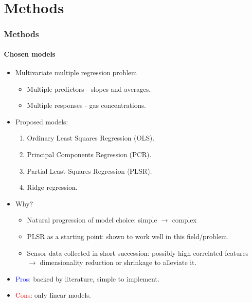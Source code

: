\documentclass{beamer}
\begin{document}
\section{Methods}
\begin{frame}
	\frametitle{Methods}
	\framesubtitle{Chosen models}
	
	\begin{itemize}
		\item Multivariate multiple regression problem
		\begin{itemize}
			\item Multiple predictors - slopes and averages.
			\item Multiple responses - gas concentrations.
		\end{itemize}
		\item Proposed models:
		\begin{enumerate}
			\item Ordinary Least Squares Regression (OLS).
			\item Principal Components Regression (PCR).
			\item Partial Least Squares Regression (PLSR).
			\item Ridge regression.
		\end{enumerate}
		\item Why?
			\begin{itemize}
				\item Natural progression of model choice: simple $\rightarrow$ complex
				\item PLSR as a starting point: shown to work well in this field/problem.
				\item Sensor data collected in short succession: possibly high correlated features $\rightarrow$ dimensionality reduction or shrinkage to alleviate it.
			\end{itemize}
		\item \textcolor{blue}{Pros}: backed by literature, simple to implement.
		\item \textcolor{red}{Cons}: only linear models.
		
	\end{itemize}
	
\end{frame}
\end{document}
